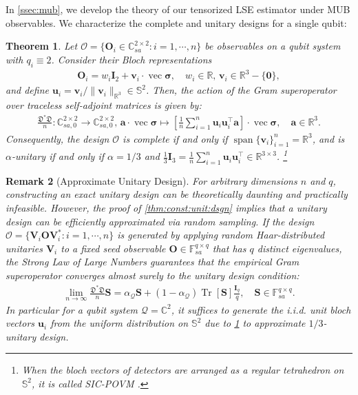 \documentclass[noinfoline]{imsart}\setcounter{tocdepth}{2}
\renewcommand{\b}[1]{\mathbb{#1}} %
\newcommand{\m}[1]{\mathbf{#1}} %
\newcommand{\s}[1]{\mathscr{#1}} %
\newcommand{\f}[1]{\mathfrak{#1}} %
\renewcommand{\c}[1]{\mathcal{#1}} %
\newcommand{\mb}[1]{\boldsymbol{#1}} %
\newcommand{\tr}[1]{\operatorname{Tr}\left[#1\right]}
\renewcommand{\vec}{\operatorname{vec}}
\DeclareMathOperator*{\spann}{span}
\theoremstyle{plain}
\newtheorem{theorem}{Theorem}[section]
\newtheorem{remark}[theorem]{Remark}
\begin{document}
In \cref{ssec:mub}, we develop the theory of our tensorized LSE estimator under MUB observables. We characterize the complete and unitary designs for a single qubit:
\begin{theorem}\label{thm:supop:qubit}
Let $\s{O} = \{\m{O}_{i} \in \b{C}_{sa}^{2 \times 2}: i = 1, \cdots, n\}$ be observables on a qubit system with $q_{i} \equiv 2$. Consider their Bloch representations
\begin{align*}
    \m{O}_{i} = w_{i} \m{I}_{2} + \m{v}_{i} \cdot \vec{\mb{\sigma}}, \quad w_{i} \in \b{R}, \, \m{v}_{i} \in \b{R}^{3} - \{\m{0}\},
\end{align*}
and define $\m{u}_{i} = \m{v}_{i} / \|\m{v}_{i}\|_{\b{R}^{3}} \in \b{S}^{2}$.
Then, the action of the Gram superoperator over traceless self-adjoint matrices is given by:
\begin{align}\label{eq:supop:qubit}
    \frac{\f{D}^{*} \f{D}}{n}: \b{C}_{sa, 0}^{2 \times 2} \to \b{C}_{sa, 0}^{2 \times 2}, \,  \m{a} \cdot \vec{\mb{\sigma}} \mapsto \left[\frac{1}{n} \sum_{i=1}^{n} \m{u}_{i} \m{u}_{i}^{\top} \m{a} \right] \cdot \vec{\mb{\sigma}}, \quad \m{a} \in \b{R}^{3}.
\end{align}
Consequently, the design $\s{O}$ is complete if and only if $\spann \{\m{v}_{i}\}_{i=1}^{n} = \b{R}^{3}$, and is $\alpha$-unitary if and only if $\alpha =1/3$ and $\frac{1}{3} \m{I}_{3} = \frac{1}{n} \sum_{i=1}^{n} \m{u}_{i} \m{u}_{i}^{\top} \in \b{R}^{3 \times 3}$. \footnote{When the bloch vectors of detectors are arranged as a regular tetrahedron on $\b{S}^{2}$, it is called SIC-POVM \cite{renes2004symmetric}.}
\end{theorem}

\begin{remark}[Approximate Unitary Design]\label{rmk:approx:unit}
For arbitrary dimensions $n$ and $q$, constructing an exact unitary design can be theoretically daunting and practically infeasible. However, the proof of \cref{thm:const:unit:dsgn} implies that a unitary design can be efficiently approximated via random sampling.
If the design $\s{O} = \{\m{V}_{i} \m{O} \m{V}_{i}^{*}: i = 1, \cdots, n\}$ is generated by applying random Haar-distributed unitaries $\m{V}_{i}$ to a fixed seed observable $\m{O} \in \b{F}_{sa}^{q \times q}$ that has $q$ distinct eigenvalues, the Strong Law of Large Numbers guarantees that the empirical Gram superoperator converges almost surely to the unitary design condition:
\begin{align*}
    \lim_{n \to \infty} \frac{\f{D}^{*} \f{D}}{n} \m{S} = \alpha_{\c{Q}} \m{S} + (1-\alpha_{\c{Q}}) \tr{\m{S}} \frac{\m{I}_{q}}{q} , \quad \m{S} \in \b{F}_{sa}^{q \times q}.
\end{align*}
In particular for a qubit system $\c{Q} = \b{C}^{2}$, it suffices to generate the i.i.d. unit bloch vectors $\m{u}_{i}$ from the uniform distribution on $\b{S}^{2}$ due to \cref{thm:supop:qubit} to approximate $1/3$-unitary design.
\end{remark}
\end{document}
